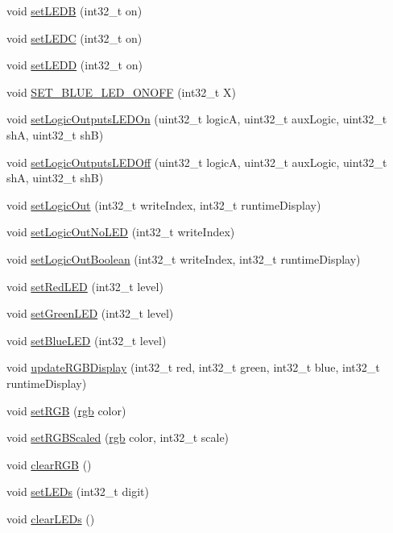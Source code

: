 \begin{DoxyCompactItemize}
void \mbox{\hyperlink{class_via_module_a26f8a7cb6d23f939d3dfcfae035d914e}{set\+L\+E\+DB}} (int32\+\_\+t on)
\item 
void \mbox{\hyperlink{class_via_module_a9b2a127bfdbf2240fbdd1f79bbef52bc}{set\+L\+E\+DC}} (int32\+\_\+t on)
\item 
void \mbox{\hyperlink{class_via_module_ad9883693e8eacafa7ee68866793adf6e}{set\+L\+E\+DD}} (int32\+\_\+t on)
\item 
void \mbox{\hyperlink{class_via_module_a1448e56cf6d131b3b344175d586853e0}{S\+E\+T\+\_\+\+B\+L\+U\+E\+\_\+\+L\+E\+D\+\_\+\+O\+N\+O\+FF}} (int32\+\_\+t X)
\item 
void \mbox{\hyperlink{class_via_module_ad676ccf2b9177bccfc7842967a792fa1}{set\+Logic\+Outputs\+L\+E\+D\+On}} (uint32\+\_\+t logicA, uint32\+\_\+t aux\+Logic, uint32\+\_\+t shA, uint32\+\_\+t shB)
\item 
void \mbox{\hyperlink{class_via_module_ab7f3b8c185a7e46f6412753c9d17ead9}{set\+Logic\+Outputs\+L\+E\+D\+Off}} (uint32\+\_\+t logicA, uint32\+\_\+t aux\+Logic, uint32\+\_\+t shA, uint32\+\_\+t shB)
\item 
void \mbox{\hyperlink{class_via_module_a980dceea193632fc47c663dc2adcf7ca}{set\+Logic\+Out}} (int32\+\_\+t write\+Index, int32\+\_\+t runtime\+Display)
\item 
void \mbox{\hyperlink{class_via_module_a6a0572d7fc135512a278b4fb304014d2}{set\+Logic\+Out\+No\+L\+ED}} (int32\+\_\+t write\+Index)
\item 
void \mbox{\hyperlink{class_via_module_ad7dd37cc52066d45418818743b3d23ad}{set\+Logic\+Out\+Boolean}} (int32\+\_\+t write\+Index, int32\+\_\+t runtime\+Display)
\item 
void \mbox{\hyperlink{class_via_module_a7a11c19ddf0c9a04061105a65d7c546b}{set\+Red\+L\+ED}} (int32\+\_\+t level)
\item 
void \mbox{\hyperlink{class_via_module_a4ead83d6ff1a8367d28d90c7e6271438}{set\+Green\+L\+ED}} (int32\+\_\+t level)
\item 
void \mbox{\hyperlink{class_via_module_a0832ffebe3e2d4d4cca044eaca59d99e}{set\+Blue\+L\+ED}} (int32\+\_\+t level)
\item 
void \mbox{\hyperlink{class_via_module_a4e627dab33ebf9b6ac2432aceb2a154d}{update\+R\+G\+B\+Display}} (int32\+\_\+t red, int32\+\_\+t green, int32\+\_\+t blue, int32\+\_\+t runtime\+Display)
\item 
void \mbox{\hyperlink{class_via_module_a9be28b96909b71625da532d5853c9ed4}{set\+R\+GB}} (\mbox{\hyperlink{structrgb}{rgb}} color)
\item 
void \mbox{\hyperlink{class_via_module_a284349df4c0e5b7153a5b82984fe9aee}{set\+R\+G\+B\+Scaled}} (\mbox{\hyperlink{structrgb}{rgb}} color, int32\+\_\+t scale)
\item 
void \mbox{\hyperlink{class_via_module_ab36185cb09e40578d0f0edb4ec74b7d3}{clear\+R\+GB}} ()
\item 
void \mbox{\hyperlink{class_via_module_a3acb105a42d49655361086d731d8e29d}{set\+L\+E\+Ds}} (int32\+\_\+t digit)
\item 
void \mbox{\hyperlink{class_via_module_ab690d8abdb4a3332db267d8d6a505bc7}{clear\+L\+E\+Ds}} ()
\end{DoxyCompactItemize}
